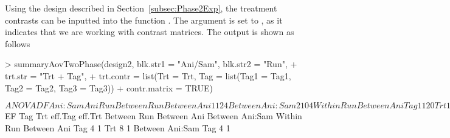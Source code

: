 \documentclass[article]{jss}
\begin{document}
Using the design described in Section~\ref{subsec:Phase2Exp}, the treatment contrasts can be inputted into the function . The argument  is set to , as it indicates that we are working with contrast matrices. The output is shown as follows
\begin{CodeChunk}
\begin{CodeInput}
> summaryAovTwoPhase(design2, blk.str1 = "Ani/Sam", blk.str2 = "Run", 
+ trt.str = "Trt + Tag", 
+ trt.contr = list(Trt = Trt, Tag = list(Tag1 = Tag1, Tag2 = Tag2, Tag3 = Tag3)) 
+ contr.matrix = TRUE)                               
\end{CodeInput}
\begin{CodeOutput}
$ANOVA
                   DF Ani:Sam Ani Run
Between Run                          
   Between Ani     1  1       2   4  
   Between Ani:Sam 2  1       0   4  
Within Run                              
   Between Ani                       
      Tag          1  1       2   0  
      Trt          1  1       2   0  
      Residual     4  1       2   0  
   Between Ani:Sam                   
      Tag          2  1       0   0  
      Residual     4  1       0   0  

$EF
                   Tag Trt eff.Tag eff.Trt
Between Run                               
   Between Ani                            
   Between Ani:Sam                        
Within Run                                   
   Between Ani                            
      Tag          4       1              
      Trt              8           1      
   Between Ani:Sam                        
      Tag          4       1              
\end{CodeOutput}
\end{CodeChunk}
\end{document}
